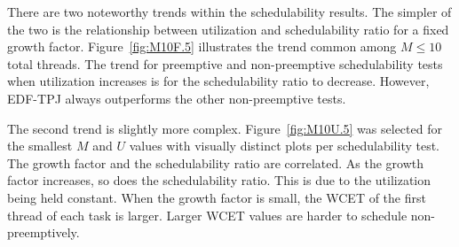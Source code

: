 \begin{table}
  \centering
  
\end{table}

There are two noteworthy trends within the schedulability results.
The simpler of the two is the relationship between utilization and
schedulability ratio for a fixed growth
factor. Figure~\ref{fig:M10F.5} illustrates the trend common among ${M
  \le 10}$ total threads. The trend for preemptive and non-preemptive
schedulability tests when utilization increases is for the
schedulability ratio to decrease. However, EDF-TPJ always outperforms 
the other non-preemptive tests. 

The second trend is slightly more complex. Figure~\ref{fig:M10U.5} was
selected for the smallest ${M}$ and ${U}$ values with visually
distinct plots per schedulability test. The growth factor and the
schedulability ratio are correlated. As the growth factor increases,
so does the schedulability ratio. This is due to the utilization being
held constant. When the growth factor is small, the WCET of the first
thread of each task is larger. Larger WCET values are harder to
schedule non-preemptively.  

